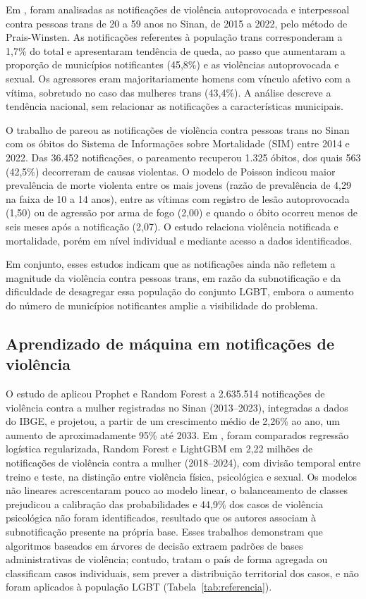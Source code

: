\documentclass[12pt]{article}
\begin{document}
Em \cite{marinho_tomazelli_firianelli:2024}, foram analisadas as notificações de violência autoprovocada e interpessoal contra pessoas trans de 20 a 59 anos no Sinan, de 2015 a 2022, pelo método de Prais-Winsten. As notificações referentes à população trans corresponderam a 1,7\% do total e apresentaram tendência de queda, ao passo que aumentaram a proporção de municípios notificantes (45,8\%) e as violências autoprovocada e sexual. Os agressores eram majoritariamente homens com vínculo afetivo com a vítima, sobretudo no caso das mulheres trans (43,4\%). A análise descreve a tendência nacional, sem relacionar as notificações a características municipais.

O trabalho de \cite{luis:2025} pareou as notificações de violência contra pessoas trans no Sinan com os óbitos do Sistema de Informações sobre Mortalidade (SIM) entre 2014 e 2022. Das 36.452 notificações, o pareamento recuperou 1.325 óbitos, dos quais 563 (42,5\%) decorreram de causas violentas. O modelo de Poisson indicou maior prevalência de morte violenta entre os mais jovens (razão de prevalência de 4,29 na faixa de 10 a 14 anos), entre as vítimas com registro de lesão autoprovocada (1,50) ou de agressão por arma de fogo (2,00) e quando o óbito ocorreu menos de seis meses após a notificação (2,07). O estudo relaciona violência notificada e mortalidade, porém em nível individual e mediante acesso a dados identificados.

Em conjunto, esses estudos indicam que as notificações ainda não refletem a magnitude da violência contra pessoas trans, em razão da subnotificação e da dificuldade de desagregar essa população do conjunto LGBT, embora o aumento do número de municípios notificantes amplie a visibilidade do problema.

\subsection{Aprendizado de máquina em notificações de violência}

O estudo de \cite{coelho_jiv:2025} aplicou Prophet e Random Forest a 2.635.514 notificações de violência contra a mulher registradas no Sinan (2013--2023), integradas a dados do IBGE, e projetou, a partir de um crescimento médio de 2,26\% ao ano, um aumento de aproximadamente 95\% até 2033. Em \cite{lucca_romero_sbbd:2026}, foram comparados regressão logística regularizada, Random Forest e LightGBM em 2,22 milhões de notificações de violência contra a mulher (2018--2024), com divisão temporal entre treino e teste, na distinção entre violência física, psicológica e sexual. Os modelos não lineares acrescentaram pouco ao modelo linear, o balanceamento de classes prejudicou a calibração das probabilidades e 44,9\% dos casos de violência psicológica não foram identificados, resultado que os autores associam à subnotificação presente na própria base. Esses trabalhos demonstram que algoritmos baseados em árvores de decisão extraem padrões de bases administrativas de violência; contudo, tratam o país de forma agregada ou classificam casos individuais, sem prever a distribuição territorial dos casos, e não foram aplicados à população LGBT (Tabela~\ref{tab:referencia}).
\end{document}
